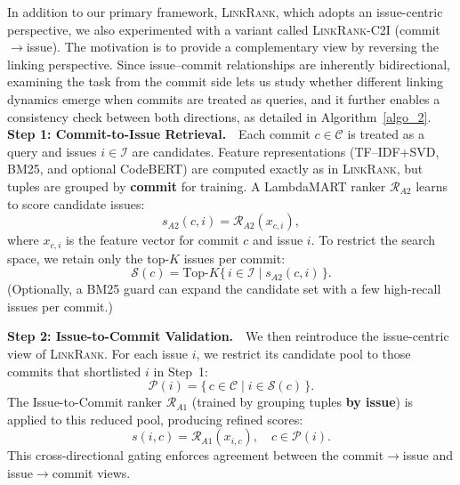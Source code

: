 In addition to our primary framework, \textsc{LinkRank}, which adopts an issue-centric perspective, we also experimented with a variant called \textsc{LinkRank-C2I} (commit$\rightarrow$issue). The motivation is to provide a complementary view by reversing the linking perspective. Since issue--commit relationships are inherently bidirectional, examining the task from the commit side lets us study whether different linking dynamics emerge when commits are treated as queries, and it further enables a consistency check between both directions, as detailed in Algorithm~\ref{algo_2}.\\

\noindent
\textbf{Step 1: Commit-to-Issue Retrieval.}\ \
Each commit $c \in \mathcal{C}$ is treated as a query and issues $i \in \mathcal{I}$ are candidates. Feature representations (TF--IDF+SVD, BM25, and optional CodeBERT) are computed exactly as in \textsc{LinkRank}, but tuples are grouped by \textbf{commit} for training. A LambdaMART ranker $\mathcal{R}_{A2}$ learns to score candidate issues:
\[
s_{A2}(c,i) = \mathcal{R}_{A2}(x_{c,i}),
\]
where $x_{c,i}$ is the feature vector for commit $c$ and issue $i$. To restrict the search space, we retain only the top-$K$ issues per commit:
\[
\mathcal{S}(c) = \mathrm{Top}\text{-}K \{\, i \in \mathcal{I} \mid s_{A2}(c,i) \,\}.
\]
(Optionally, a BM25 guard can expand the candidate set with a few high-recall issues per commit.)

\noindent
\textbf{Step 2: Issue-to-Commit Validation.}\ \
We then reintroduce the issue-centric view of \textsc{LinkRank}. For each issue $i$, we restrict its candidate pool to those commits that shortlisted $i$ in Step~1:
\[
\mathcal{P}(i) = \{\, c \in \mathcal{C} \mid i \in \mathcal{S}(c) \,\}.
\]
The Issue-to-Commit ranker $\mathcal{R}_{A1}$ (trained by grouping tuples \textbf{by issue}) is applied to this reduced pool, producing refined scores:
\[
s(i,c) = \mathcal{R}_{A1}(x_{i,c}), \quad c \in \mathcal{P}(i).
\]
This cross-directional gating enforces agreement between the commit$\rightarrow$issue and issue$\rightarrow$commit views.\\




